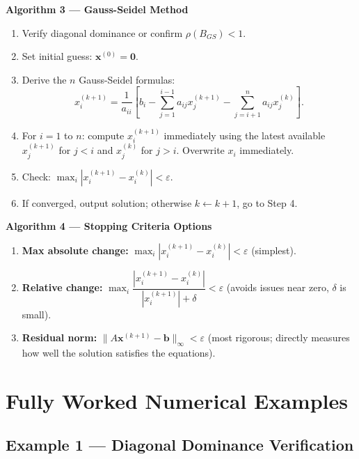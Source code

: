 \documentclass[12pt,a4paper]{article}
\begin{document}
\textbf{Algorithm 3 --- Gauss-Seidel Method}

\begin{enumerate}
  \item Verify diagonal dominance or confirm \(\rho(B_{GS}) < 1\).
  \item Set initial guess: \(\mathbf{x}^{(0)} = \mathbf{0}\).
  \item Derive the \(n\) Gauss-Seidel formulas:
    \[
      x_i^{(k+1)} = \frac{1}{a_{ii}}\!\left[b_i
        - \sum_{j=1}^{i-1}a_{ij}x_j^{(k+1)}
        - \sum_{j=i+1}^{n}a_{ij}x_j^{(k)}\right].
    \]
  \item For \(i = 1\) to \(n\): compute \(x_i^{(k+1)}\) immediately using the
        latest available \(x_j^{(k+1)}\) for \(j < i\) and \(x_j^{(k)}\) for \(j > i\).
        Overwrite \(x_i\) immediately.
  \item Check: \(\max_i|x_i^{(k+1)}-x_i^{(k)}| < \varepsilon\).
  \item If converged, output solution; otherwise \(k \leftarrow k+1\), go to Step 4.
\end{enumerate}

\textbf{Algorithm 4 --- Stopping Criteria Options}

\begin{enumerate}
  \item \textbf{Max absolute change:}
        \(\max_i|x_i^{(k+1)}-x_i^{(k)}| < \varepsilon\) (simplest).
  \item \textbf{Relative change:}
        \(\max_i\dfrac{|x_i^{(k+1)}-x_i^{(k)}|}{|x_i^{(k+1)}|+\delta} < \varepsilon\)
        (avoids issues near zero, \(\delta\) is small).
  \item \textbf{Residual norm:}
        \(\|A\mathbf{x}^{(k+1)}-\mathbf{b}\|_\infty < \varepsilon\)
        (most rigorous; directly measures how well the solution satisfies the equations).
\end{enumerate}

\section{Fully Worked Numerical Examples}

\subsection*{Example 1 --- Diagonal Dominance Verification}
\end{document}
